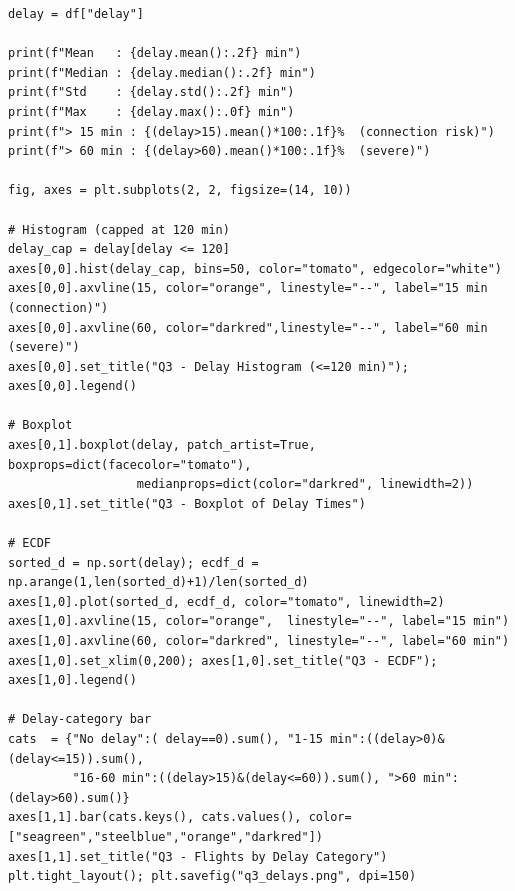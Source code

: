 \documentclass[12pt, a4paper]{report}
\begin{document}
\begin{lstlisting}[style=python, caption={Python — Delay distribution, thresholds, and visualisations}]
delay = df["delay"]

print(f"Mean   : {delay.mean():.2f} min")
print(f"Median : {delay.median():.2f} min")
print(f"Std    : {delay.std():.2f} min")
print(f"Max    : {delay.max():.0f} min")
print(f"> 15 min : {(delay>15).mean()*100:.1f}%  (connection risk)")
print(f"> 60 min : {(delay>60).mean()*100:.1f}%  (severe)")

fig, axes = plt.subplots(2, 2, figsize=(14, 10))

# Histogram (capped at 120 min)
delay_cap = delay[delay <= 120]
axes[0,0].hist(delay_cap, bins=50, color="tomato", edgecolor="white")
axes[0,0].axvline(15, color="orange", linestyle="--", label="15 min (connection)")
axes[0,0].axvline(60, color="darkred",linestyle="--", label="60 min (severe)")
axes[0,0].set_title("Q3 - Delay Histogram (<=120 min)"); axes[0,0].legend()

# Boxplot
axes[0,1].boxplot(delay, patch_artist=True, boxprops=dict(facecolor="tomato"),
                  medianprops=dict(color="darkred", linewidth=2))
axes[0,1].set_title("Q3 - Boxplot of Delay Times")

# ECDF
sorted_d = np.sort(delay); ecdf_d = np.arange(1,len(sorted_d)+1)/len(sorted_d)
axes[1,0].plot(sorted_d, ecdf_d, color="tomato", linewidth=2)
axes[1,0].axvline(15, color="orange",  linestyle="--", label="15 min")
axes[1,0].axvline(60, color="darkred", linestyle="--", label="60 min")
axes[1,0].set_xlim(0,200); axes[1,0].set_title("Q3 - ECDF"); axes[1,0].legend()

# Delay-category bar
cats  = {"No delay":( delay==0).sum(), "1-15 min":((delay>0)&(delay<=15)).sum(),
         "16-60 min":((delay>15)&(delay<=60)).sum(), ">60 min":(delay>60).sum()}
axes[1,1].bar(cats.keys(), cats.values(), color=["seagreen","steelblue","orange","darkred"])
axes[1,1].set_title("Q3 - Flights by Delay Category")
plt.tight_layout(); plt.savefig("q3_delays.png", dpi=150)
\end{lstlisting}
\end{document}
